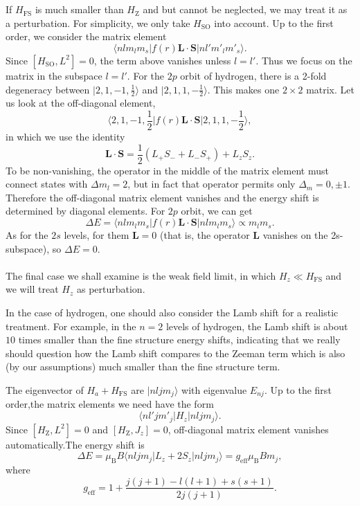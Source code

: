 \\ \\
If $H_{\mathrm{FS}}$ is much smaller than $H_{\mathrm{Z}}$ and but cannot be neglected, we may treat it as a perturbation. For simplicity, we only take $H_{\mathrm{SO}}$ into account. Up to the first order, we consider the matrix element
\[\langle n l m_l m_s | f(r)\bm{L}\cdot\bm{S}| n l' m'_l m'_s\rangle.\]
Since $[H_{\mathrm{SO}},L^2] = 0$, the term above vanishes unless $l = l'$. Thus we focus on the matrix in the subspace $l = l'$. For the $2p$ orbit of hydrogen, there is a 2-fold degeneracy between $|2,1,-1,\frac{1}{2}\rangle$ and $|2,1,1,-\frac{1}{2}\rangle$.
This makes one $2 \times 2$ matrix. Let us look at the off-diagonal element,
\[\langle 2,1,-1,\frac{1}{2} | f(r)\bm{L}\cdot\bm{S}| 2,1,1,-\frac{1}{2}\rangle,\]
in which we use the identity
\[\bm{L}\cdot\bm{S} = \frac{1}{2}(L_+S_-+L_-S_+)+L_zS_z.\]
To be non-vanishing, the operator in the middle of the matrix element must connect states with $\Delta m_l = 2$, but in fact that operator permits only $\Delta_m = 0,\pm1$. Therefore the off-diagonal matrix element vanishes and the energy shift is determined by diagonal elements. For $2p$ orbit, we can get
\[\Delta E = \langle n l m_l m_s | f(r)\bm{L}\cdot\bm{S}| n l m_l m_s\rangle \propto m_lm_s.\]
As for the $2s$ levels, for them $\bm{L} = 0$ (that is, the operator $\bm{L}$ vanishes on the 2s-subspace), so $\Delta E = 0$.
\\ \\
The final case we shall examine is the weak field limit, in which $H_z \ll H_{\mathrm{FS}}$ and we will treat $H_z$ as perturbation.
\begin{note}
In the case of hydrogen, one should also consider the Lamb shift for a realistic treatment. For example, in the $n=2$ levels of hydrogen, the Lamb shift is about $10$ times smaller than the fine structure energy shifts, indicating that we really should question how the Lamb shift compares to the Zeeman term which is also (by our assumptions) much smaller than the fine structure term.
\end{note}
\noindent
The eigenvector of $H_a + H_{\mathrm{FS}}$ are $|nljm_j\rangle$ with eigenvalue $E_{nj}$. Up to the first order,the matrix elements we need have the form
\[\langle n l' j m'_j | H_z | n l j m_j\rangle.\]
Since $[H_{\mathrm{Z}},L^2] = 0$ and $[H_{\mathrm{Z}},J_z] = 0$, off-diagonal matrix element vanishes automatically.The energy shift is
\[\Delta E = \mu_{\mathrm{B}} B\langle n l j m_j | L_z + 2S_z | n l j m_j\rangle = g_{\mathrm{eff}} \mu_{\mathrm{B}} B m_j,\]
where
\[g_{\mathrm{eff}} = 1 + \frac{j(j+1)-l(l+1)+s(s+1)}{2j(j+1)}.\]

